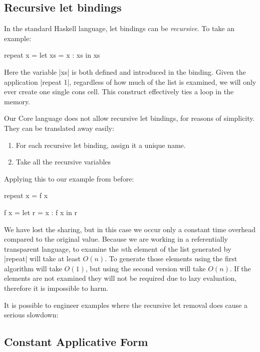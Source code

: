 \subsection{Recursive let bindings}

In the standard Haskell language, let bindings can be \textit{recursive}. To take an example:

\begin{code}
repeat x = let xs = x : xs
           in xs
\end{code}

Here the variable |xs| is both defined and introduced in the binding. Given the application |repeat 1|, regardless of how much of the list is examined, we will only ever create one single cons cell. This construct effectively ties a loop in the memory.

Our Core language does not allow recursive let bindings, for reasons of simplicity. They can be translated away easily:

\begin{enumerate}
\item For each recursive let binding, assign it a unique name.
\item Take all the recursive variables
\end{enumerate}

Applying this to our example from before:

\begin{code}
repeat x = f x

f x =  let r = x : f x
       in r
\end{code}

We have lost the sharing, but in this case we occur only a constant time overhead compared to the original value. Because we are working in a referentially transparent language, to examine the $n$th element of the list generated by |repeat| will take at least $O(n)$. To generate those elements using the first algorithm will take $O(1)$, but using the second version will take $O(n)$. If the elements are not examined they will not be required due to lazy evaluation, therefore it is impossible to harm.

It is possible to engineer examples where the recursive let removal does cause a serious slowdown:



\subsection{Constant Applicative Form}




